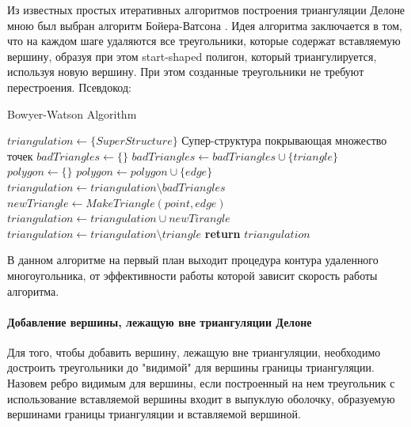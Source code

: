 \documentclass{fefu}
\newenvironment{algo}[1][]
  {\begin{algorithm}[#1]
     \selectlanguage{english}
     \floatname{algorithm}{Алгоритм}
  }
  {\end{algorithm}}
\begin{document}
Из известных простых итеративных алгоритмов построения триангуляции Делоне мною был выбран алгоритм Бойера-Ватсона
\cite{Bowyer, Watson}. Идея алгоритма заключается в том, что на каждом шаге удаляются все треугольники, которые 
содержат вставляемую вершину, образуя при этом start-shaped полигон, который триангулируется, используя новую вершину.
При этом созданные треугольники не требуют перестроения. Псевдокод:
\begin{algo}[H]
    \caption{Bowyer-Watson Algorithm}
    \begin{algorithmic}[1]
            \State $triangulation \gets \{SuperStructure\}$ \Comment Супер-структура покрывающая множество точек
                \State $badTriangles \gets \{\}$
                       \State $badTriangles \gets badTriangles \cup \{triangle\}$
                    \EndIf
                \EndFor
                \State $polygon \gets \{\}$
                            \State $polygon \gets polygon \cup \{edge\}$
                        \EndIf
                    \EndFor
                \EndFor
                \State $triangulation \gets triangulation \setminus badTriangles$
                    \State $newTriangle \gets MakeTriangle(point, edge)$
                    \State $triangulation \gets triangulation \cup newTirangle$
                \EndFor
                        \State $triangulation \gets triangulation \setminus triangle$
                    \EndIf
                \EndFor
            \EndFor
            \State \textbf{return} $triangulation$
        \EndProcedure
    \end{algorithmic}
\end{algo}

В данном алгоритме на первый план выходит процедура контура удаленного многоугольника, от эффективности работы которой 
зависит скорость работы алгоритма.
\paragraph{Добавление вершины, лежащую вне триангуляции Делоне}
\label{AddOutsideOfTriangulationVertex}
Для того, чтобы добавить вершину, лежащую вне триангуляции, необходимо достроить треугольники до "видимой" для вершины 
границы триангуляции. Назовем ребро видимым для вершины, если построенный на нем треугольник с использование вставляемой 
вершины  входит в выпуклую оболочку, образуемую вершинами границы триангуляции и вставляемой вершиной.
\end{document}
